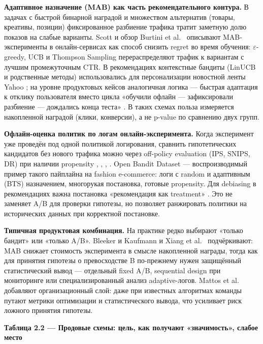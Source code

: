 \textbf{Адаптивное назначение (MAB) как часть рекомендательного контура.} В задачах с быстрой бинарной наградой и множеством альтернатив (товары, креативы, позиции) фиксированное разбиение трафика тратит заметную долю показов на слабые варианты. Scott \cite{ref12} и обзор Burtini et al.~\cite{ref13} описывают MAB-эксперименты в онлайн-сервисах как способ снизить regret во время обучения: $\varepsilon$-greedy, UCB и Thompson Sampling перераспределяют трафик к вариантам с лучшим промежуточным CTR. В рекомендациях контекстные бандиты (LinUCB и родственные методы) использовались для персонализации новостной ленты Yahoo \cite{ref6}; на уровне продуктовых кейсов аналогичная логика --- быстрая адаптация к отклику пользователя вместо цикла «обучили офлайн --- зафиксировали разбиение --- дождались конца теста» \cite{ref23}. В таких схемах польза измеряется накопленной наградой (клики, конверсии), а не p-value по сравнению двух групп.

\textbf{Офлайн-оценка политик по логам онлайн-эксперимента.} Когда эксперимент уже проведён под одной политикой логирования, сравнить гипотетических кандидатов без нового трафика можно через off-policy evaluation (IPS, SNIPS, DR) при наличии propensity \cite{ref6}, \cite{ref24}, \cite{ref27}, \cite{ref30}. Open Bandit Dataset \cite{ref26} --- воспроизводимый пример такого пайплайна на fashion e-commerce: логи с random и адаптивным (BTS) назначением, многорукая постановка, готовые propensity. Для debiasing в рекомендациях важна постановка «рекомендация как treatment» \cite{ref31}. Это не заменяет A/B для проверки гипотезы, но позволяет ранжировать политики на исторических данных при корректной постановке.

\textbf{Типичная продуктовая комбинация.} На практике редко выбирают «только бандит» или «только A/B». Bleeker и Kaufmann \cite{ref22} и Xiang et al.~\cite{ref21} подчёркивают: MAB снижает стоимость эксперимента в смысле накопленной награды, тогда как для принятия гипотезы о превосходстве B по-прежнему нужен защищённый статистический вывод --- отдельный fixed A/B, sequential design при мониторинге \cite{ref19} или специализированный анализ adaptive-логов. Mattos et al.~\cite{ref18} добавляют организационный слой: даже при известных алгоритмах команды путают метрики оптимизации и статистического вывода, что усиливает риск ложного принятия гипотезы.

\textbf{Таблица 2.2 --- Продовые схемы: цель, как получают «значимость», слабое место}

